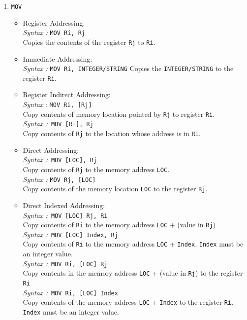 \documentclass[11pt]{report}
\begin{document}
\begin{enumerate}
\item \texttt{MOV}
\begin{itemize}

\item Register Addressing:\\
\textit{Syntax :} \texttt{MOV Ri, Rj}\\
Copies the contents of the register \texttt{Rj} to \texttt{Ri}.

\item Immediate Addressing:\\
\textit{Syntax :} \texttt{MOV Ri, INTEGER/STRING}
Copies the \texttt{INTEGER/STRING} to the register \texttt{Ri}.


\item Register Indirect Addressing:\\
\textit{Syntax }: \texttt{MOV Ri, [Rj]}\\
Copy contents of memory location pointed by \texttt{Rj} to register \texttt{Ri}.\\
\textit{Syntax :}\texttt{ MOV [Ri], Rj} \\
Copy contents of \texttt{Rj} to the location whose address is in \texttt{Ri}.


\item Direct Addressing:\\
\textit{Syntax :}\texttt{ MOV [LOC], Rj}\\
Copy contents of \texttt{Rj}  to the memory address \texttt{LOC}.\\
\textit{Syntax :} \texttt{MOV Rj, [LOC]}\\
Copy contents of the memory location \texttt{LOC} to the register \texttt{Rj}.

\item Direct Indexed Addressing: \\
\textit{Syntax :}\texttt{ MOV [LOC] Rj, Ri}\\
Copy contents of \texttt{Ri} to the memory address \texttt{LOC} + (value in \texttt{Rj}) \\
\textit{Syntax :}\texttt{ MOV [LOC] Index, Rj}\\
Copy contents of \texttt{Ri} to the memory address \texttt{LOC} + \texttt{Index}. \texttt{Index} must be an integer value. \\
\textit{Syntax :}\texttt{ MOV Ri, [LOC] Rj}\\
Copy contents in the memory address \texttt{LOC} + (value in \texttt{Rj}) to the register \texttt{Ri}\\
\textit{Syntax :}\texttt{ MOV Ri, [LOC] Index}\\
Copy contents of the memory address \texttt{LOC} + \texttt{Index} to the register \texttt{Ri}. \texttt{Index} must be an integer value. \\
\end{itemize}



\end{enumerate}
\end{document}
